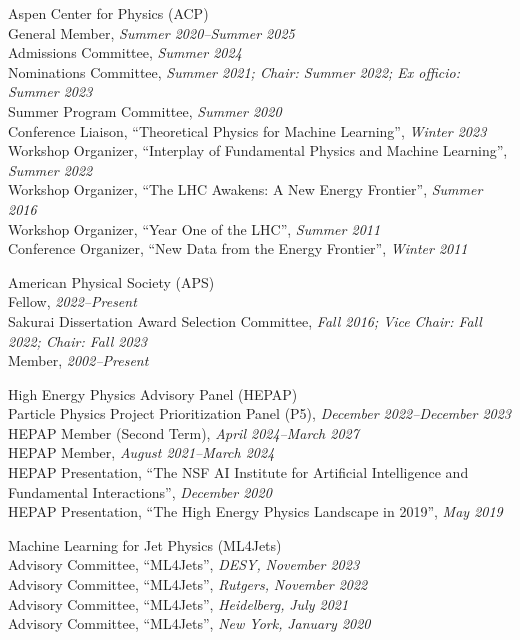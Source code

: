 \item Aspen Center for Physics (ACP)
\\ General Member, \emph{Summer 2020--Summer 2025}
\\ Admissions Committee, \emph{Summer 2024}
\\ Nominations Committee, \emph{Summer 2021; Chair: Summer 2022; Ex officio: Summer 2023}
\\ Summer Program Committee, \emph{Summer 2020}
\\ Conference Liaison, ``Theoretical Physics for Machine Learning'', \emph{Winter 2023}
\\ Workshop Organizer, ``Interplay of Fundamental Physics and Machine Learning'', \emph{Summer 2022}
\\ Workshop Organizer, ``The LHC Awakens: A New Energy Frontier'', \emph{Summer 2016}
\\ Workshop Organizer, ``Year One of the LHC'', \emph{Summer 2011}
\\ Conference Organizer, ``New Data from the Energy Frontier'', \emph{Winter 2011}
\item American Physical Society (APS)
\\ Fellow, \emph{2022--Present}
\\ Sakurai Dissertation Award Selection Committee, \emph{Fall 2016; Vice Chair: Fall 2022; Chair: Fall 2023}
\\ Member, \emph{2002--Present}
\item High Energy Physics Advisory Panel (HEPAP)
\\ Particle Physics Project Prioritization Panel (P5), \emph{December 2022--December 2023}
\\ HEPAP Member (Second Term), \emph{April 2024--March 2027}
\\ HEPAP Member, \emph{August 2021--March 2024}
\\ HEPAP Presentation, ``The NSF AI Institute for Artificial Intelligence and Fundamental Interactions'', \emph{December 2020}
\\ HEPAP Presentation, ``The High Energy Physics Landscape in 2019'', \emph{May 2019}
\item Machine Learning for Jet Physics (ML4Jets)
\\ Advisory Committee, ``ML4Jets'', \emph{DESY, }\emph{November 2023}
\\ Advisory Committee, ``ML4Jets'', \emph{Rutgers, }\emph{November 2022}
\\ Advisory Committee, ``ML4Jets'', \emph{Heidelberg, }\emph{July 2021}
\\ Advisory Committee, ``ML4Jets'', \emph{New York, }\emph{January 2020}
